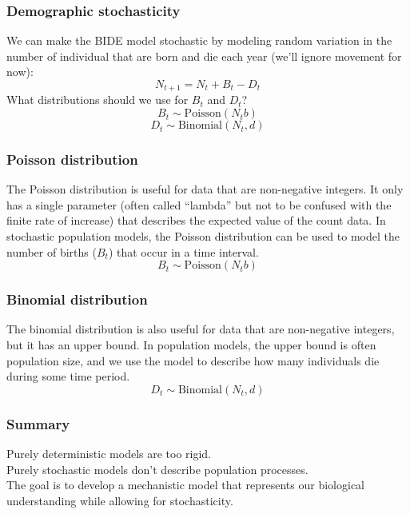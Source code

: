 \documentclass[color=usenames,dvipsnames]{beamer}\usepackage[]{graphicx}\usepackage[]{xcolor}
\begin{document}
\begin{frame}[fragile]
  \frametitle{Demographic stochasticity}
  We can make the BIDE model stochastic by modeling random variation
  in the number of individual that are born and die each year (we'll
  ignore movement for now):
  \[
     N_{t+1} = N_t + B_t - D_t
  \]
  \pause
  What distributions should we use for $B_t$ and $D_t$? 
  \pause
  \[
    B_t \sim \mathrm{Poisson}(N_t b)
  \]
  \[
    D_t \sim \mathrm{Binomial}(N_t, d)
  \]
\end{frame}


\begin{frame}
  \frametitle{Poisson distribution}
  The Poisson distribution is useful for data that are non-negative
  integers. It only has a single parameter (often called ``lambda''
  but not to be confused with the finite rate of increase) that
  describes the expected value of the count data. In stochastic
  population models, the Poisson distribution can be used to model the
  number of births ($B_t$) that occur in a time interval. 
  \[
    B_t \sim \mathrm{Poisson}(N_t b)
  \]
\end{frame}


\begin{frame}
  \frametitle{Binomial distribution}
  The binomial distribution is also useful for data that are
  non-negative integers, but it has an upper bound. In population
  models, the upper bound is often population size, and we use the model
  to describe how many individuals die during some time period.
  \[
    D_t \sim \mathrm{Binomial}(N_t, d)
  \]
\end{frame}



\begin{frame}
  \frametitle{Summary}
  \Large
  Purely deterministic models are too rigid. \\
  \vfill
  Purely stochastic models don't describe population processes. \\
  \vfill
  The goal is to develop a mechanistic model that represents 
  our biological understanding while allowing for stochasticity. \\
\end{frame}










\end{document}
